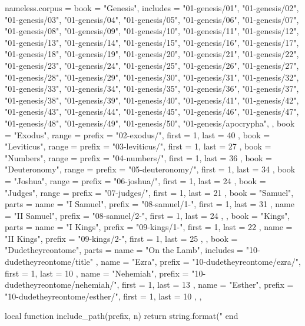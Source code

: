 \documentclass[11pt]{book}
\begin{document}
\begin{luacode*}
nameless.corpus = {
  { book = "Genesis", includes = {
    "01-genesis/01", "01-genesis/02", "01-genesis/03", "01-genesis/04", "01-genesis/05",
    "01-genesis/06", "01-genesis/07", "01-genesis/08", "01-genesis/09", "01-genesis/10",
    "01-genesis/11", "01-genesis/12", "01-genesis/13", "01-genesis/14", "01-genesis/15",
    "01-genesis/16", "01-genesis/17", "01-genesis/18", "01-genesis/19", "01-genesis/20",
    "01-genesis/21", "01-genesis/22", "01-genesis/23", "01-genesis/24", "01-genesis/25",
    "01-genesis/26", "01-genesis/27", "01-genesis/28", "01-genesis/29", "01-genesis/30",
    "01-genesis/31", "01-genesis/32", "01-genesis/33", "01-genesis/34", "01-genesis/35",
    "01-genesis/36", "01-genesis/37", "01-genesis/38", "01-genesis/39", "01-genesis/40",
    "01-genesis/41", "01-genesis/42", "01-genesis/43", "01-genesis/44", "01-genesis/45",
    "01-genesis/46", "01-genesis/47", "01-genesis/48", "01-genesis/49", "01-genesis/50",
    "01-genesis/apocrypha",
  } },
  { book = "Exodus", range = { prefix = "02-exodus/", first = 1, last = 40 } },
  { book = "Leviticus", range = { prefix = "03-leviticus/", first = 1, last = 27 } },
  { book = "Numbers", range = { prefix = "04-numbers/", first = 1, last = 36 } },
  { book = "Deuteronomy", range = { prefix = "05-deuteronomy/", first = 1, last = 34 } },
  { book = "Joshua", range = { prefix = "06-joshua/", first = 1, last = 24 } },
  { book = "Judges", range = { prefix = "07-judges/", first = 1, last = 21 } },
  { book = "Samuel", parts = {
    { name = "I Samuel", prefix = "08-samuel/1-", first = 1, last = 31 },
    { name = "II Samuel", prefix = "08-samuel/2-", first = 1, last = 24 },
  } },
  { book = "Kings", parts = {
    { name = "I Kings", prefix = "09-kings/1-", first = 1, last = 22 },
    { name = "II Kings", prefix = "09-kings/2-", first = 1, last = 25 },
  } },
  { book = "Dudetheyreontome", parts = {
    { name = "On the Lamb", includes = { "10-dudetheyreontome/title" } },
    { name = "Ezra", prefix = "10-dudetheyreontome/ezra/", first = 1, last = 10 },
    { name = "Nehemiah", prefix = "10-dudetheyreontome/nehemiah/", first = 1, last = 13 },
    { name = "Esther", prefix = "10-dudetheyreontome/esther/", first = 1, last = 10 },
  } },
}

local function include_path(prefix, n)
  return string.format("%
end


\end{luacode*}
\end{document}
